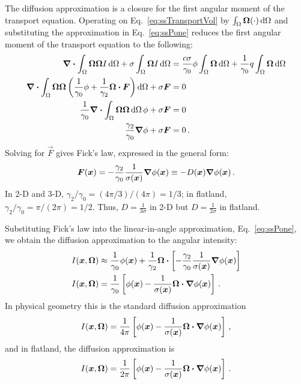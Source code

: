 The diffusion approximation is a closure for the first angular moment of
the transport equation. Operating on Eq.~\eqref{eq:ssTransportVol} by
$\int_\Omega \bm{\Omega} (\cdot) \mathop{}\!\mathrm{d} \Omega$ and substituting
the approximation in Eq.~\eqref{eq:ssPone} reduces the first angular moment of
the transport equation to the following:
\begin{align*}
  \bm{\nabla} \bm{\cdot} \int_\Omega \bm{\Omega} \bm{\Omega} I
  \mathop{}\!\mathrm{d}\Omega
  + \sigma \int_\Omega \bm{\Omega} I \mathop{}\!\mathrm{d}\Omega
  &=
  \frac{c\sigma}{\gamma_0} \phi \int_\Omega \bm{\Omega} \mathop{}\!\mathrm{d}\Omega
  + \frac{1}{\gamma_0} q \int_\Omega \bm{\Omega} \mathop{}\!\mathrm{d}\Omega
  \\
  \bm{\nabla} \bm{\cdot} \int_\Omega \bm{\Omega} \bm{\Omega} \left(
  \frac{1}{\gamma_0}\phi + \frac{1}{\gamma_2} \bm{\Omega} \bm{\cdot} \bm{F}
  \right)
  \mathop{}\!\mathrm{d}\Omega
  + \sigma \bm{F}
  &= 0
  \\
  \frac{1}{\gamma_0} \bm{\nabla} \bm{\cdot} \int_\Omega \bm{\Omega} \bm{\Omega}
  \mathop{}\!\mathrm{d}\Omega\, \phi 
  + \sigma \bm{F} &= 0
  \\
  \frac{\gamma_2}{\gamma_0} \bm{\nabla} \phi + \sigma \bm{F} &= 0 \,.
\end{align*}
Solving for $\vec{F}$ gives Fick's law, expressed in the general form:
\begin{equation} \label{eq:fickGeneral}
  \bm{F}(\bm{x})
  = - \frac{\gamma_2}{\gamma_0} \frac{1}{\sigma(\bm{x})} \bm{\nabla} \phi(\bm{x})
  \equiv -D(\bm{x}) \bm{\nabla} \phi(\bm{x})\,.
\end{equation}
In 2-D and 3-D, $\gamma_2/\gamma_0 = (4\pi / 3) / (4\pi) = 1/3$; in
flatland, $\gamma_2/\gamma_0 = \pi / (2\pi) = 1/2$. Thus, $D=\frac{1}{3\sigma}$ in
2-D but $D=\frac{1}{2\sigma}$ in flatland.

Substituting Fick's law into the linear-in-angle approximation,
Eq.~\eqref{eq:ssPone}, we obtain the diffusion approximation to the angular
intensity:
\begin{align} \nonumber
  I(\bm{x}, \bm{\Omega})
  &\approx \frac{1}{\gamma_0} \phi(\bm{x})
  + \frac{1}{\gamma_2} \bm{\Omega} \bm{\cdot} \left[ - \frac{\gamma_2}{\gamma_0}
  \frac{1}{\sigma(\bm{x})} \bm{\nabla} \phi(\bm{x}) \right]
  \\ \label{eq:diffusionIntensity}
  I(\bm{x}, \bm{\Omega})
  &= \frac{1}{\gamma_0} \left[ \phi(\bm{x})
  - \frac{1}{\sigma(\bm{x})}
  \bm{\Omega} \bm{\cdot} \bm{\nabla} \phi(\bm{x}) \right] \,.
\end{align}
In physical geometry this is the standard diffusion approximation
\begin{equation*}
 I(\bm{x}, \bm{\Omega})
= \frac{1}{4\pi} \left[ \phi(\bm{x}) - \frac{1}{\sigma(\bm{x})} \bm{\Omega}
\bm{\cdot} \bm{\nabla} \phi(\bm{x}) \right] \,,
\end{equation*}
and in flatland, the diffusion approximation is
\begin{equation}\label{eq:flatlandDiffusion}
 I(\bm{x}, \bm{\Omega})
= \frac{1}{2\pi} \left[ \phi(\bm{x}) - \frac{1}{\sigma(\bm{x})} \bm{\Omega}
\bm{\cdot} \bm{\nabla} \phi(\bm{x}) \right]\,.
\end{equation}

